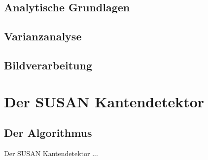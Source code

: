 \documentclass[a4paper, 11pt]{report}
\theoremstyle{definition}
\begin{document}
	\section{Analytische Grundlagen}
	\section{Varianzanalyse}
	\section{Bildverarbeitung}

\chapter{Der SUSAN Kantendetektor}
	\section{Der Algorithmus}
		Der SUSAN Kantendetektor ...
\end{document}
